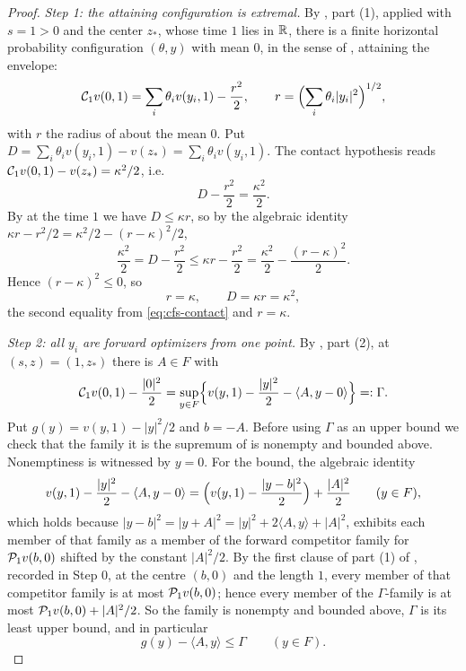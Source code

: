 \begin{proof}
\emph{Step 1: the attaining configuration is extremal.}
By , part (1), applied with $s=1>0$ and the center
$z_*$, whose time $1$ lies in $\mathbb{R}$, there is a finite horizontal probability
configuration $(\theta,y)$ with mean $0$, in the sense of
, attaining the envelope:
\[
  \mathcal{C}_1v(0,1)=\sum_i\theta_iv(y_i,1)-\frac{r^2}{2},
  \qquad r=\Bigl(\sum_i\theta_i|y_i|^2\Bigr)^{1/2},
\]
with $r$ the radius of  about the mean $0$. Put
$D=\sum_i\theta_iv(y_i,1)-v(z_*)=\sum_i\theta_iv(y_i,1)$. The contact hypothesis
reads $\mathcal{C}_1v(0,1)-v(z_*)=\kappa^2/2$, i.e.
\begin{equation}\label{eq:cfs-contact}
  D-\frac{r^2}{2}=\frac{\kappa^2}{2}.
\end{equation}
By  at the time $1$ we have $D\le\kappa r$, so by the
algebraic identity $\kappa r-r^2/2=\kappa^2/2-(r-\kappa)^2/2$,
\[
  \frac{\kappa^2}{2}=D-\frac{r^2}{2}\le\kappa r-\frac{r^2}{2}
   =\frac{\kappa^2}{2}-\frac{(r-\kappa)^2}{2}.
\]
Hence $(r-\kappa)^2\le0$, so
\begin{equation}\label{eq:contact-configuration}
  r=\kappa,\qquad D=\kappa r=\kappa^2 ,
\end{equation}
the second equality from \eqref{eq:cfs-contact} and $r=\kappa$.

\emph{Step 2: all $y_i$ are forward optimizers from one point.}
By , part (2), at $(s,z)=(1,z_*)$ there is $A\in F$ with
\[
  \mathcal{C}_1v(0,1)-\frac{|0|^2}{2}
   =\sup_{y\in F}\Bigl\{v(y,1)-\frac{|y|^2}{2}-\langle A,y-0\rangle\Bigr\}
   =:\Gamma .
\]
Put $g(y)=v(y,1)-|y|^2/2$ and $b=-A$. Before using $\Gamma$ as an upper bound
we check that the family it is the supremum of is nonempty and bounded above.
Nonemptiness is witnessed by $y=0$. For the bound, the algebraic identity
\begin{equation}\label{eq:cfs-square}
  v(y,1)-\frac{|y|^2}{2}-\langle A,y-0\rangle
   =\Bigl(v(y,1)-\frac{|y-b|^2}{2}\Bigr)+\frac{|A|^2}{2}
   \qquad(y\in F),
\end{equation}
which holds because $|y-b|^2=|y+A|^2=|y|^2+2\langle A,y\rangle+|A|^2$, exhibits
each member of that family as a member of the forward competitor family for
$\mathcal{P}_1v(b,0)$ shifted by the constant $|A|^2/2$. By the first clause of
part (1) of , recorded in Step 0, at the
centre $(b,0)$ and the length $1$, every member of that competitor family is at
most $\mathcal{P}_1v(b,0)$; hence every member of the $\Gamma$-family is at most
$\mathcal{P}_1v(b,0)+|A|^2/2$. So the family is nonempty and bounded above, $\Gamma$
is its least upper bound, and in particular
\begin{equation}\label{eq:cfs-gammabound}
  g(y)-\langle A,y\rangle\le\Gamma\qquad(y\in F).
\end{equation}


\end{proof}

